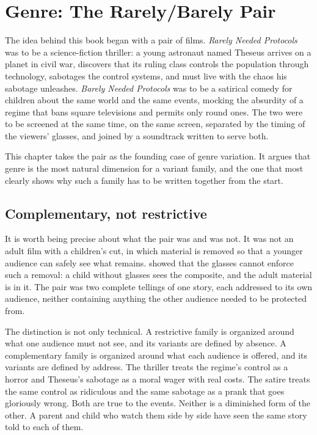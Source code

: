 \chapter{Genre: The Rarely/Barely Pair}\label{ch:genre}

The idea behind this book began with a pair of films. \emph{Rarely Needed Protocols} was to be a science-fiction thriller: a young astronaut named Theseus arrives on a planet in civil war, discovers that its ruling class controls the population through technology, sabotages the control systems, and must live with the chaos his sabotage unleashes. \emph{Barely Needed Protocols} was to be a satirical comedy for children about the same world and the same events, mocking the absurdity of a regime that bans square televisions and permits only round ones. The two were to be screened at the same time, on the same screen, separated by the timing of the viewers' glasses, and joined by a soundtrack written to serve both.

This chapter takes the pair as the founding case of genre variation. It argues that genre is the most natural dimension for a variant family, and the one that most clearly shows why such a family has to be written together from the start.

\section{Complementary, not restrictive}

It is worth being precise about what the pair was and was not. It was not an adult film with a children's cut, in which material is removed so that a younger audience can safely see what remains.  showed that the glasses cannot enforce such a removal: a child without glasses sees the composite, and the adult material is in it. The pair was two complete tellings of one story, each addressed to its own audience, neither containing anything the other audience needed to be protected from.

The distinction is not only technical. A restrictive family is organized around what one audience must not see, and its variants are defined by absence. A complementary family is organized around what each audience is offered, and its variants are defined by address. The thriller treats the regime's control as a horror and Theseus's sabotage as a moral wager with real costs. The satire treats the same control as ridiculous and the same sabotage as a prank that goes gloriously wrong. Both are true to the events. Neither is a diminished form of the other. A parent and child who watch them side by side have seen the same story told to each of them.

